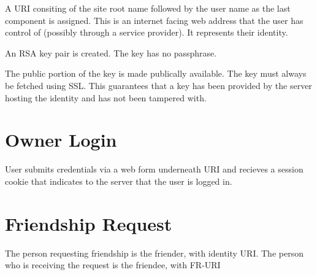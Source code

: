 \documentclass[letterpaper,11pt,oneside]{article}
\begin{document}
A URI consiting of the site root name followed by the user name as the last
component is assigned. This is an internet facing web address that the user has
control of (possibly through a service provider). It represents their identity.

An RSA key pair is created. The key has no passphrase. 

The public portion of the key is made publically available. The key must always
be fetched using SSL. This guarantees that a key has been provided by the
server hosting the identity and has not been tampered with.

\section{Owner Login}

User submits credentials via a web form underneath URI and recieves a session
cookie that indicates to the server that the user is logged in.

\section{Friendship Request}

The person requesting friendship is the friender, with identity URI.
The person who is receiving the request is the friendee, with FR-URI
\end{document}
